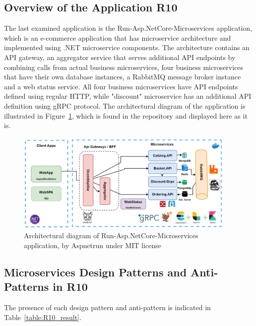 \documentclass{Configuration_Files/PoliMi3i_thesis}
\begin{document}
\subsection{Overview of the Application R10}
\label{subsec:R10_overview}

The last examined application is the Run-Asp.NetCore-Microservices application, which is an e-commerce application that has microservice architecture and implemented using .NET microservice components.
The architecture contains an API gateway, an aggregator service that serves additional API endpoints by combining calls from actual business microservices, four business microservices that have their own database instances, a RabbitMQ message broker instance and a web status service.
All four business microservices have API endpoints defined using regular HTTP, while "discount" microservice has an additional API definition using gRPC protocol.
The architectural diagram of the application is illustrated in Figure~\ref{fig:R10_arch}, which is found in the repository and displayed here as it is.

\begin{figure}[H]
\centering
\includegraphics[width=0.95\textwidth]{myImages/R10.png}
\caption{Architectural diagram of Run-Asp.NetCore-Microservices application, by Aspnetrun under MIT license}
\label{fig:R10_arch}
\end{figure}

\subsection{Microservices Design Patterns and Anti-Patterns in R10}
\label{subsec:R10_detection}

The presence of each design pattern and anti-pattern is indicated in Table~\ref{table:R10_result}.
\end{document}
